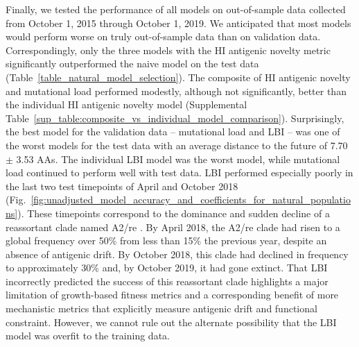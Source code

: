 Finally, we tested the performance of all models on out-of-sample data collected from October 1, 2015 through October 1, 2019.
We anticipated that most models would perform worse on truly out-of-sample data than on validation data.
Correspondingly, only the three models with the HI antigenic novelty metric significantly outperformed the naive model on the test data (Table~\ref{table_natural_model_selection}).
The composite of HI antigenic novelty and mutational load performed modestly, although not significantly, better than the individual HI antigenic novelty model (Supplemental Table~\ref{sup_table:composite_vs_individual_model_comparison}).
Surprisingly, the best model for the validation data -- mutational load and LBI -- was one of the worst models for the test data with an average distance to the future of 7.70 $\pm$ 3.53 AAs.
The individual LBI model was the worst model, while mutational load continued to perform well with test data.
LBI performed especially poorly in the last two test timepoints of April and October 2018 (Fig.~\ref{fig:unadjusted_model_accuracy_and_coefficients_for_natural_populations}).
These timepoints correspond to the dominance and sudden decline of a reassortant clade named A2/re \cite{Potter2019}.
By April 2018, the A2/re clade had risen to a global frequency over 50\% from less than 15\% the previous year, despite an absence of antigenic drift.
By October 2018, this clade had declined in frequency to approximately 30\% and, by October 2019, it had gone extinct.
That LBI incorrectly predicted the success of this reassortant clade highlights a major limitation of growth-based fitness metrics and a corresponding benefit of more mechanistic metrics that explicitly measure antigenic drift and functional constraint.
However, we cannot rule out the alternate possibility that the LBI model was overfit to the training data.

